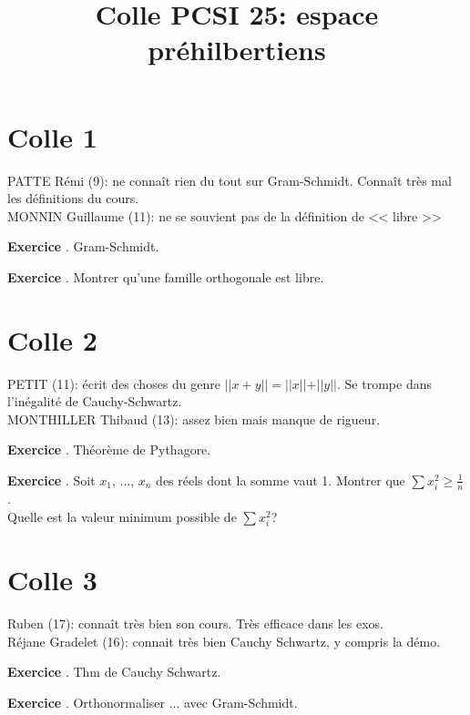 \documentclass[10pt,a4paper]{article}
\title{Colle PCSI 25: espace préhilbertiens}
\newcounter{question}
\newcounter{exo}
\newenvironment{exo}{\vspace{0.5cm}\setcounter{question}{0}\addtocounter{exo}{1} \noindent \textbf{Exercice \theexo}. \normalsize }{\par}
\begin{document}
	\maketitle
	
	\section*{Colle 1}

	\setcounter{exo}{0}
	PATTE Rémi (9): ne connaît rien du tout sur Gram-Schmidt. Connaît très mal les définitions du cours.\\
	MONNIN Guillaume (11): ne se souvient pas de la définition de << libre >>\\
	
	\begin{exo}
		Gram-Schmidt.
	\end{exo}

	\begin{exo}
		Montrer qu'une famille orthogonale est libre.
	\end{exo}	

	\section*{Colle 2}

	\setcounter{exo}{0}
	PETIT (11): écrit des choses du genre $\vert \vert x + y \vert \vert = \vert \vert x \vert \vert + \vert \vert y \vert \vert$. Se trompe dans l'inégalité de Cauchy-Schwartz.\\
	MONTHILLER Thibaud (13): assez bien mais manque de rigueur.\\
	
	\begin{exo}
		Théorème de Pythagore.
	\end{exo}
		
	\begin{exo}
		Soit $x_1$, ..., $x_n$ des réels dont la somme vaut 1.
		Montrer que $\sum x_i^2 \geq \frac{1}{n}$.\\
		Quelle est la valeur minimum possible de $\sum x_i^2$?		
	\end{exo}	
	
	\section*{Colle 3}
	\setcounter{exo}{0}
	Ruben (17): connaît très bien son cours. Très efficace dans les exos.\\
	Réjane Gradelet (16): connait très bien Cauchy Schwartz, y compris la démo.
	
	\begin{exo}
		Thm de Cauchy Schwartz.
	\end{exo}

	\begin{exo}
		Orthonormaliser ... avec Gram-Schmidt.
	\end{exo}	
\end{document}

